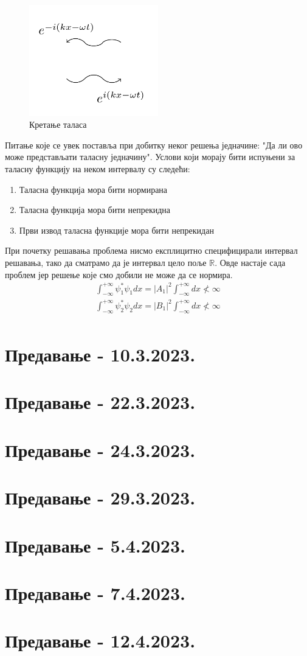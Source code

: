 \documentclass{tufte-handout} %
\theoremstyle{definition}
\theoremstyle{remark}
\newcommand{\R}{\mathbb{R}}
\begin{document}
\begin{figure}
	\centering
	\includegraphics[width=0.5\textwidth]{kretanje_talasa.png}
	\caption{Кретање таласа}
\end{figure}
Питање које се увек поставља при добитку неког решења једначине: "Да ли ово може представљати таласну једначину". Услови који морају бити испуњени за таласну функцију на неком интервалу су следећи:
\begin{enumerate}
	\item Таласна функција мора бити нормирана
	\item Таласна функција мора бити непрекидна
	\item Први извод таласна функције мора бити непрекидан
\end{enumerate}
При почетку решавања проблема нисмо експлицитно специфицирали интервал решавања, тако да сматрамо да је интервал цело поље $\R$. Овде настаје сада проблем јер решење које смо добили не може да се нормира.
\begin{align}
	\int_{-\infty}^{+\infty}\psi_1^{\ast}\psi_1 dx = |A_1|^2\int_{-\infty}^{+\infty}dx\nless \infty\\ 
	\int_{-\infty}^{+\infty}\psi_2^{\ast}\psi_2 dx = |B_1|^2\int_{-\infty}^{+\infty}dx\nless \infty\\
\end{align}
\section{Предавање - 10.3.2023.}
\section{Предавање - 22.3.2023.}
\section{Предавање - 24.3.2023.}
\section{Предавање - 29.3.2023.}
\section{Предавање - 5.4.2023.}
\section{Предавање - 7.4.2023.}
\section{Предавање - 12.4.2023.}
\end{document}
